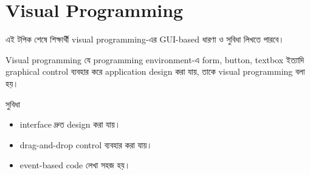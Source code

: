 \section{Visual Programming}

\begin{learningbox}
এই টপিক শেষে শিক্ষার্থী visual programming-এর GUI-based ধারণা ও সুবিধা লিখতে পারবে।
\end{learningbox}

\begin{definitionbox}{Visual programming}
যে programming environment-এ form, button, textbox ইত্যাদি graphical control ব্যবহার করে application design করা যায়, তাকে visual programming বলা হয়।
\end{definitionbox}

\begin{center}
\end{center}

\begin{keypointbox}{সুবিধা}
\begin{itemize}
\item interface দ্রুত design করা যায়।
\item drag-and-drop control ব্যবহার করা যায়।
\item event-based code লেখা সহজ হয়।
\end{itemize}
\end{keypointbox}
